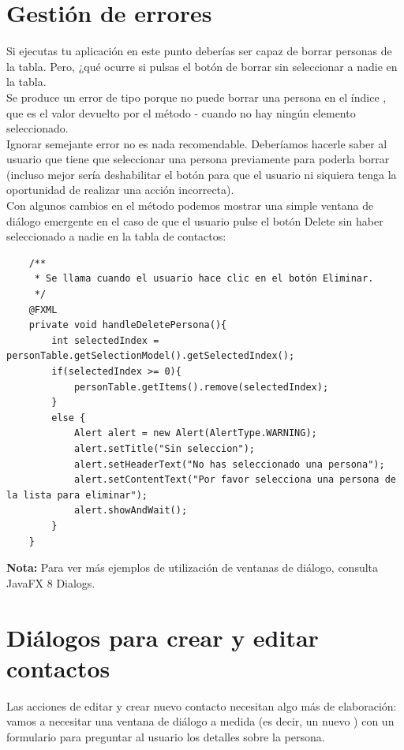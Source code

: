 \section{Gestión de errores}
Si ejecutas tu aplicación en este punto deberías ser capaz de borrar personas de la tabla. 
Pero, ¿qué ocurre si pulsas el botón de borrar sin seleccionar a nadie en la tabla.\\
Se produce un error de tipo  porque no puede borrar una persona 
en el índice , que es el valor devuelto por el método  - 
cuando no hay ningún elemento seleccionado.\\
Ignorar semejante error no es nada recomendable. Deberíamos hacerle saber al usuario que tiene 
que seleccionar una persona previamente para poderla borrar (incluso mejor sería deshabilitar el 
botón para que el usuario ni siquiera tenga la oportunidad de realizar una acción incorrecta).\\

Con algunos cambios en el método  podemos mostrar una simple ventana de diálogo 
emergente en el caso de que el usuario pulse el botón Delete sin haber seleccionado a nadie en la 
tabla de contactos:\\
\begin{verbatim}
    /**
	 * Se llama cuando el usuario hace clic en el botón Eliminar.
	 */
	@FXML
	private void handleDeletePersona(){
		int selectedIndex = personTable.getSelectionModel().getSelectedIndex();
		if(selectedIndex >= 0){
			personTable.getItems().remove(selectedIndex);
		}
		else {
			Alert alert = new Alert(AlertType.WARNING);
			alert.setTitle("Sin seleccion");
			alert.setHeaderText("No has seleccionado una persona");
			alert.setContentText("Por favor selecciona una persona de la lista para eliminar");
			alert.showAndWait();
		}
	}
\end{verbatim}

\begin{tcolorbox}[leftrule=3mm]
	\textbf{Nota:} Para ver más ejemplos de utilización de ventanas de diálogo, consulta JavaFX 8 Dialogs.
\end{tcolorbox}

\section{Diálogos para crear y editar contactos}
Las acciones de editar y crear nuevo contacto necesitan algo más de elaboración: vamos a 
necesitar una ventana de diálogo a medida (es decir, un nuevo ) con un formulario 
para preguntar al usuario los detalles sobre la persona.
